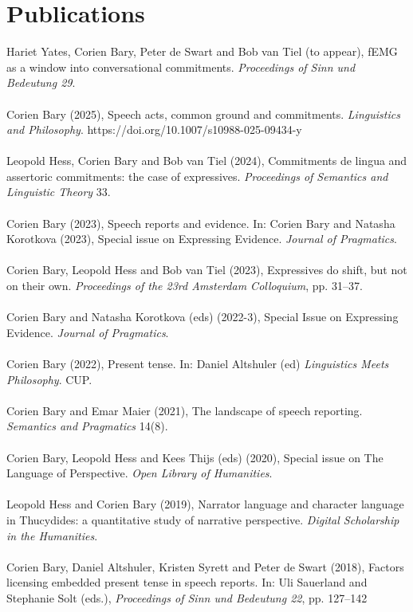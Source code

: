 \documentclass[a4paper,11pt]{article}
\begin{document}
\section*{Publications}
Hariet Yates, Corien Bary, Peter de Swart and Bob van Tiel (to appear), fEMG as a window into conversational commitments. \emph{Proceedings of Sinn und Bedeutung 29}.\\\\ 
Corien Bary (2025), Speech acts, common ground and commitments. \emph{Linguistics and Philosophy}. https://doi.org/10.1007/s10988-025-09434-y \\\\
Leopold Hess, Corien Bary and Bob van Tiel (2024), Commitments de lingua and assertoric commitments: the case of expressives. \emph{Proceedings of Semantics and Linguistic Theory} 33.\\\\
Corien Bary (2023), Speech reports and evidence. In: Corien Bary and Natasha Korotkova (2023), Special issue on Expressing Evidence. \emph{Journal of Pragmatics}.\\\\
Corien Bary, Leopold Hess and Bob van Tiel (2023), Expressives do shift, but not on their own. \emph{Proceedings of the 23rd Amsterdam Colloquium}, pp. 31--37.\\\\
Corien Bary and Natasha Korotkova (eds) (2022-3), Special Issue on Expressing Evidence. \emph{Journal of Pragmatics}.\\\\
Corien Bary (2022), Present tense. In: Daniel Altshuler (ed) \emph{Linguistics Meets Philosophy}. CUP.\\\\
Corien Bary and Emar Maier (2021), The landscape of speech reporting. \emph{Semantics and Pragmatics} 14(8).\\\\
Corien Bary, Leopold Hess and Kees Thijs (eds) (2020), Special issue on The Language of Perspective. \emph{Open Library of Humanities}.\\\\
Leopold Hess and Corien Bary (2019), Narrator language and character language in Thucydides: a quantitative study of narrative perspective. \emph{Digital Scholarship in the Humanities}.\\\\
Corien Bary, Daniel Altshuler, Kristen Syrett and Peter de Swart (2018), Factors licensing embedded present tense in speech reports. In: Uli Sauerland and Stephanie Solt (eds.), \emph{Proceedings of Sinn und Bedeutung 22}, pp. 127--142\\\\
\end{document}
